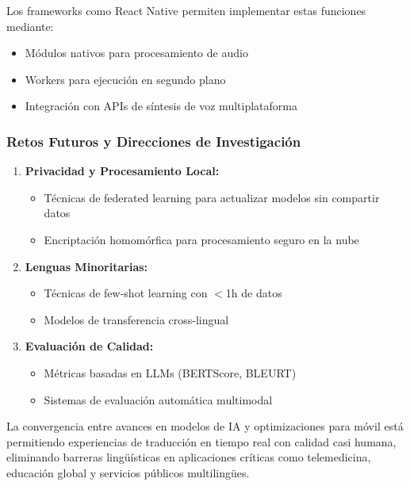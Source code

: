Los frameworks como React Native permiten implementar estas funciones mediante:
\begin{itemize}
    \item Módulos nativos para procesamiento de audio
    \item Workers para ejecución en segundo plano
    \item Integración con APIs de síntesis de voz multiplataforma
\end{itemize}

\subsubsection{Retos Futuros y Direcciones de Investigación}

\begin{enumerate}
    \item \textbf{Privacidad y Procesamiento Local:}
    \begin{itemize}
        \item Técnicas de federated learning para actualizar modelos sin compartir datos
        \item Encriptación homomórfica para procesamiento seguro en la nube
    \end{itemize}
    
    \item \textbf{Lenguas Minoritarias:}
    \begin{itemize}
        \item Técnicas de few-shot learning con $<$1h de datos
        \item Modelos de transferencia cross-lingual
    \end{itemize}
    
    \item \textbf{Evaluación de Calidad:}
    \begin{itemize}
        \item Métricas basadas en LLMs (BERTScore, BLEURT)
        \item Sistemas de evaluación automática multimodal
    \end{itemize}
\end{enumerate}

La convergencia entre avances en modelos de IA y optimizaciones para móvil está permitiendo experiencias de traducción en tiempo real con calidad casi humana, eliminando barreras lingüísticas en aplicaciones críticas como telemedicina, educación global y servicios públicos multilingües\cite{jia2022cvss}\cite{jia2022translatotron2highqualitydirect}\cite{zhou2024preservingspeakerinformationdirect}.
